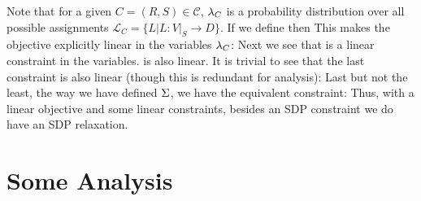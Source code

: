 \documentclass[12pt]{article}
\begin{document}
Note that for a given $C =(R, S) \in \mathcal{C}$, $\lambda_C$ is a probability distribution over all possible assignments $\mathcal{L}_C = \{L | L: V|_S \rightarrow D\}$. 
If we define 
then 
This makes the objective explicitly linear in the variables $\lambda_C$:
Next we see that 
is a linear constraint in the variables. 
is also linear.
It is trivial to see that the last constraint is also linear (though this is redundant for analysis):
Last but not the least, the way we have defined $\Sigma$, we have the equivalent constraint:
Thus, with a linear objective and some linear constraints, besides an SDP constraint we do have an SDP relaxation.


\section{Some Analysis}
\end{document}
